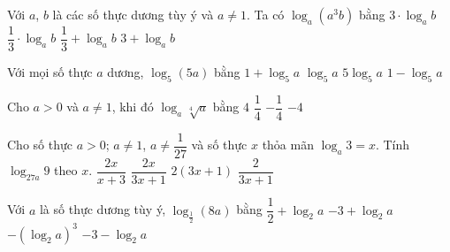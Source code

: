 \begin{ex}%
	Với  $a$, $b$ là các số thực dương tùy ý và $a\ne 1$. Ta có $\log_a\left(a^3b\right)$ bằng
	\choice 
		 {$3\cdot \log_ab$}
		{$\dfrac{1}{3}\cdot  \log_ab$}
		{$\dfrac{1}{3}+\log_ab$} 
		{\True  $3+\log_ab$}
\end{ex}

\begin{ex}%
	Với mọi số  thực $a$ dương, $\log_5(5a)$ bằng
	 \choice
		{\True $1+\log_5a$} 
		{$\log_5a$} 
		 {$5\log_5a$}
		{$1-\log_5a$} 
\end{ex}

\begin{ex}%
	Cho $a>0$ và  $a\ne 1$, khi đó $\log_a\sqrt[4]{a}$ bằng
	\choice 
		 {$4$}
		{\True $\dfrac{1}{4}$} 
		 {$-\dfrac{1}{4}$}
		{$-4$} 
\end{ex}

\begin{ex}%
	Cho số thực  $a>0$; $a\ne 1$, $a\ne\dfrac{1}{27}$ và số thực $x$ thỏa mãn $\log_a3=x$. Tính $\log_{27a}9$ theo $x$.
	 \choice
		 {$\dfrac{2x}{x+3}$}
		{\True  $\dfrac{2x}{3x+1}$}
		{$2\left(3x+1\right)$} 
		{$\dfrac{2}{3x+1}$} 
\end{ex}

\begin{ex}%
	Với $a$ là số thực  dương tùy ý, $\log_{\tfrac{1}{2}}\left(8a\right)$ bằng
	\choice 
		 {$\dfrac{1}{2}+\log_2a$}
		 {$-3+\log_2a$}
		{$-\left(\log_2a\right)^3$} 
		{\True  $-3-\log_2a$}
\end{ex}

